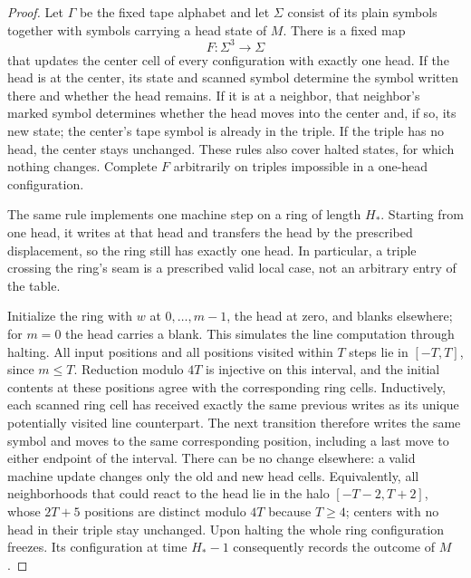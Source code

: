 \documentclass[11pt]{article}
\theoremstyle{definition}
\begin{document}
\begin{proof}
Let $\Gamma$ be the fixed tape alphabet and let $\Sigma$ consist of its
plain symbols together with symbols carrying a head state of $M$. There
is a fixed map
\[
 F:\Sigma^3\longrightarrow\Sigma
\]
that updates the center cell of every configuration with exactly one head.
If the head is at the center, its state and scanned symbol determine the
symbol written there and whether the head remains. If it is at a neighbor,
that neighbor's marked symbol determines whether the head moves into the
center and, if so, its new state; the center's tape symbol is already in
the triple. If the triple has no head, the center stays unchanged. These
rules also cover halted states, for which nothing changes. Complete $F$
arbitrarily on triples impossible in a one-head configuration.

The same rule implements one machine step on a ring of length $H_*$.
Starting from one head, it writes at that head and transfers the head by
the prescribed displacement, so the ring still has exactly one head.
In particular, a triple crossing the ring's seam is a prescribed valid
local case, not an arbitrary entry of the table.

Initialize the ring with $w$ at $0,\ldots,m-1$, the head at zero, and
blanks elsewhere; for $m=0$ the head carries a blank. This simulates the
line computation through halting. All input positions and all positions
visited within $T$ steps lie in $[-T,T]$, since $m\le T$. Reduction modulo
$4T$ is injective on this interval, and the initial contents at these
positions agree with the corresponding ring cells. Inductively, each
scanned ring cell has received exactly the same previous writes as its
unique potentially visited line counterpart. The next transition
therefore writes the same symbol and moves to the same corresponding
position, including a last move to either endpoint of the interval.
There can be no change elsewhere: a valid machine update changes only
the old and new head cells. Equivalently, all neighborhoods that could
react to the head lie in the halo $[-T-2,T+2]$, whose $2T+5$ positions are
distinct modulo $4T$ because $T\ge4$; centers with no head in their triple
stay unchanged. Upon halting the whole ring configuration freezes.
Its configuration at time $H_*-1$ consequently records the outcome of $M$.


\end{proof}
\end{document}
